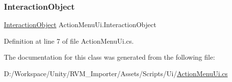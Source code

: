\subsubsection{\texorpdfstring{InteractionObject}{InteractionObject}}
{\footnotesize\ttfamily \mbox{\hyperlink{class_interaction_object}{Interaction\+Object}} Action\+Menu\+Ui.\+Interaction\+Object}



Definition at line 7 of file Action\+Menu\+Ui.\+cs.



The documentation for this class was generated from the following file\+:\begin{DoxyCompactItemize}
\item 
D\+:/\+Workspace/\+Unity/\+R\+V\+M\+\_\+\+Importer/\+Assets/\+Scripts/\+Ui/\mbox{\hyperlink{_action_menu_ui_8cs}{Action\+Menu\+Ui.\+cs}}\end{DoxyCompactItemize}
